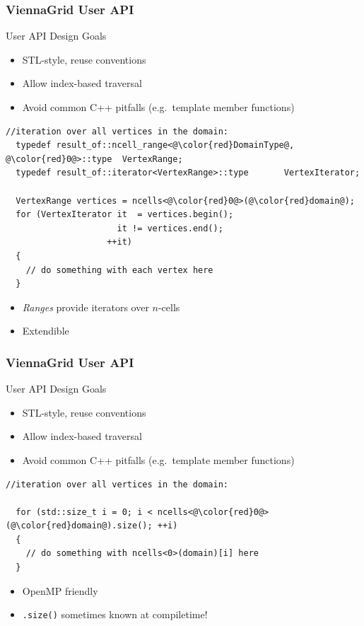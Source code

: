 


\begin{frame}[fragile]
\frametitle{ViennaGrid User API}
 \begin{block}{User API Design Goals}
  \begin{itemize}
   \item STL-style, reuse conventions
   \item Allow index-based traversal
   \item Avoid common C++ pitfalls (e.g.~template member functions)
  \end{itemize}

  \begin{lstlisting}[basicstyle=\scriptsize\ttfamily,escapechar=@]
  //iteration over all vertices in the domain:
  typedef result_of::ncell_range<@\color{red}DomainType@, @\color{red}0@>::type  VertexRange;
  typedef result_of::iterator<VertexRange>::type       VertexIterator;
  
  VertexRange vertices = ncells<@\color{red}0@>(@\color{red}domain@);
  for (VertexIterator it  = vertices.begin();
                      it != vertices.end();
                    ++it)
  {
    // do something with each vertex here
  }
  \end{lstlisting} 

   \begin{itemize}
    \item \emph{Ranges} provide iterators over $n$-cells
    \item Extendible
   \end{itemize}
 \end{block}
 \vspace*{0.45cm}
\end{frame}


\begin{frame}[fragile]
\frametitle{ViennaGrid User API}
 \begin{block}{User API Design Goals}
  \begin{itemize}
   \item STL-style, reuse conventions
   \item Allow index-based traversal
   \item Avoid common C++ pitfalls (e.g.~template member functions)
  \end{itemize}

  \begin{lstlisting}[basicstyle=\scriptsize\ttfamily,escapechar=@]
  //iteration over all vertices in the domain:
  
  for (std::size_t i = 0; i < ncells<@\color{red}0@>(@\color{red}domain@).size(); ++i)
  {
    // do something with ncells<0>(domain)[i] here
  }
  \end{lstlisting} 

   \begin{itemize}
    \item OpenMP friendly
    \item \lstinline|.size()| sometimes known at compiletime!
   \end{itemize}
 \end{block}
 \vspace*{1.75cm}
\end{frame}

